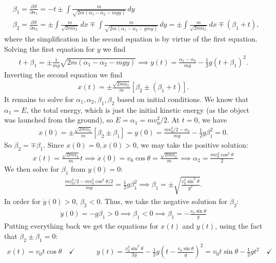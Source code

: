 \documentclass{article}
\theoremstyle{definition}
\newcommand{\p}{\partial}
\newcommand{\al}{\alpha}
\newcommand{\be}{\beta}
\newcommand{\f}[2]{\frac{#1}{#2}}
\newcommand{\lp}{\left(}
\newcommand{\rp}{\right)}
\newcommand{\lb}{\left[}
\newcommand{\rb}{\right]}
\begin{document}
\begin{align*}
&\be_1 = \f{\p S}{\p \al_1} = -t \pm \int \f{m}{\sqrt{2m(\al_1-\al_2 - mgy)}}\,dy \\
&\be_2 = \f{\p S}{\p \al_2} = \pm \int \f{m}{\sqrt{2m \al_2}}\,dx \mp  \int \f{m}{\sqrt{2m(\al_1 - \al_2 - gmy)}}\,dy = \pm \int \f{m}{\sqrt{2m \al_2}}\,dx \mp (\be_1 + t),
\end{align*}
where the simplification in the second equation is by virtue of the first equation. Solving the first equation for $y$ we find 
\begin{align*}
t + \be_1 = \pm \f{1}{mg} \sqrt{2m(\al_1 - \al_2 - mgy)} \implies y(t) = \f{\al_1 - \al_2}{mg} - \f{1}{2}g(t+\be_1)^2.
\end{align*}
Inverting the second equation we find 
\begin{align*}
x(t) = \pm  \f{\sqrt{2m\al_2}}{m} \lb \be_2 \pm (\be_1 + t) \rb.
\end{align*}
It remains to solve for $\al_1,\al_2, \be_1,\be_2$ based on initial conditions. We know that $\boxed{\al_1 = E}$, the total energy, which is just the initial kinetic energy (as the object was launched from the ground), so $E = \al_1= mv_0^2/2$. At $t=0$, we have
\begin{align*}
x(0) = \pm \f{\sqrt{2m \al_2}}{m}[\be_2 \pm \be_1] = y(0) =  \f{mv_0^2/2 - \al_2}{mg} - \f{1}{2}g\be_1^2 =0.
\end{align*} 
So $\be_2 = \mp \be_1$. Since $x(0)= 0, \dot x(0) >0$, we may take the positive solution:
\begin{align*}
x(t) = \f{\sqrt{2m\al_2}}{m}t \implies \dot x(0) = v_0\cos \theta = \f{\sqrt{2m\al_2}}{m} \implies \boxed{\al_2 = \f{m v_0^2\cos^2\theta}{2}}
\end{align*}
We then solve for $\be_1$ from $y(0) = 0$:
\begin{align*}
\f{mv_0^2/2 - mv_0^2\cos^2\theta/2}{mg} = \f{1}{2}g\be_1^2 \implies \be_1 = \pm \sqrt{\f{v_0^2\sin^2\theta}{g^2}}.
\end{align*}
In order for $\dot y(0) > 0$, $\be_2 < 0$. Thus, we take the negative solution for $\be_2$:
\begin{align*}
\dot y(0) = -g\be_1 > 0\implies \be_1 < 0 \implies \boxed{\be_1 = -\f{v_0 \sin\theta}{g}}
\end{align*}
Putting everything back we get the equations for $x(t)$ and $y(t)$, using the fact that $\be_2 \pm \be_1 = 0$:
\begin{align*}
\boxed{x(t) = v_0 t\cos\theta}\quad  \checkmark \quad\quad\quad \boxed{y(t) = \f{v_0^2\sin^2\theta}{2g} - \f{1}{2}g\lp t - \f{v_0\sin\theta}{g} \rp^2 = v_0t\sin\theta-\f{1}{2}gt^2} \quad \checkmark
\end{align*}
\end{document}

